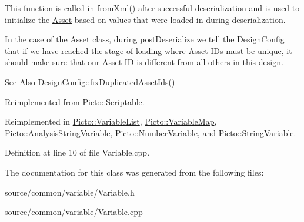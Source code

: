 This function is called in \hyperlink{class_picto_1_1_asset_a8bed4da09ecb1c07ce0dab313a9aba67}{from\-Xml()} after successful deserialization and is used to initialize the \hyperlink{class_picto_1_1_asset}{Asset} based on values that were loaded in during deserialization. 

In the case of the \hyperlink{class_picto_1_1_asset}{Asset} class, during post\-Deserialize we tell the \hyperlink{class_picto_1_1_design_config}{Design\-Config} that if we have reached the stage of loading where \hyperlink{class_picto_1_1_asset}{Asset} I\-Ds must be unique, it should make sure that our \hyperlink{class_picto_1_1_asset}{Asset} I\-D is different from all others in this design. \begin{DoxySeeAlso}{See Also}
\hyperlink{class_picto_1_1_design_config_ab57e0738b97e4358ab09530cd6815fc0}{Design\-Config\-::fix\-Duplicated\-Asset\-Ids()} 
\end{DoxySeeAlso}


Reimplemented from \hyperlink{class_picto_1_1_scriptable_a5d36462b3e5c89f0d6ae8fe466c1b060}{Picto\-::\-Scriptable}.



Reimplemented in \hyperlink{class_picto_1_1_variable_list_affb7de311b36cc25414b6386ac401467}{Picto\-::\-Variable\-List}, \hyperlink{class_picto_1_1_variable_map_a8f40e1a04708e7632fa51b25e4eb4850}{Picto\-::\-Variable\-Map}, \hyperlink{class_picto_1_1_analysis_string_variable_ad1d229ad548ade0f6cacc5be895a9d27}{Picto\-::\-Analysis\-String\-Variable}, \hyperlink{class_picto_1_1_number_variable_a6ab9b74741c023e43dab955a975cc6c4}{Picto\-::\-Number\-Variable}, and \hyperlink{class_picto_1_1_string_variable_a1a1628007dc860d2f092f9fbb03944f1}{Picto\-::\-String\-Variable}.



Definition at line 10 of file Variable.\-cpp.



The documentation for this class was generated from the following files\-:\begin{DoxyCompactItemize}
\item 
source/common/variable/Variable.\-h\item 
source/common/variable/Variable.\-cpp\end{DoxyCompactItemize}
